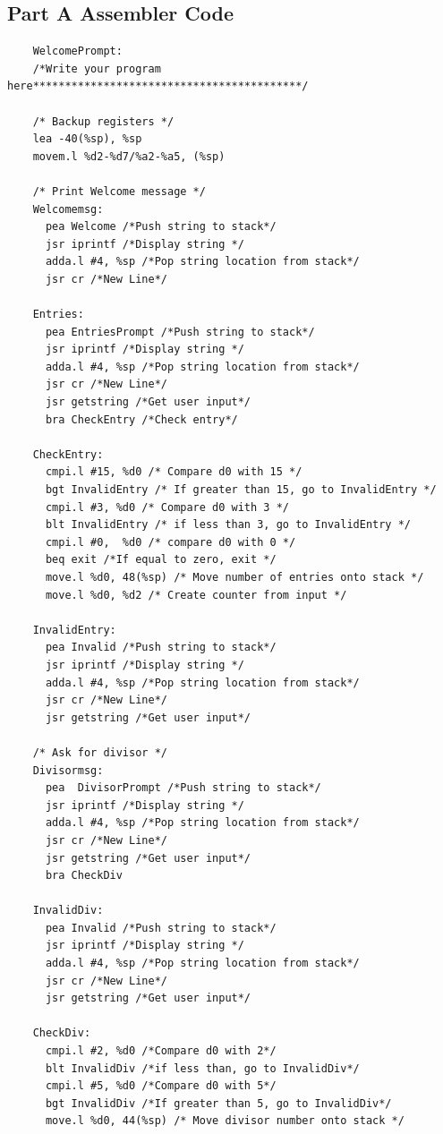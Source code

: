 \documentclass[10pt, letterpaper, titlepage]{article} %
\begin{document}
\newpage

\subsection{Part A Assembler Code}
\begin{lstlisting}
	WelcomePrompt:
	/*Write your program here******************************************/
	
	/* Backup registers */
	lea -40(%sp), %sp
	movem.l %d2-%d7/%a2-%a5, (%sp)
	
	/* Print Welcome message */
	Welcomemsg:
	  pea Welcome /*Push string to stack*/
	  jsr iprintf /*Display string */
	  adda.l #4, %sp /*Pop string location from stack*/
	  jsr cr /*New Line*/
	
	Entries:
	  pea EntriesPrompt /*Push string to stack*/
	  jsr iprintf /*Display string */
	  adda.l #4, %sp /*Pop string location from stack*/
	  jsr cr /*New Line*/
	  jsr getstring /*Get user input*/
	  bra CheckEntry /*Check entry*/
	
	CheckEntry:
	  cmpi.l #15, %d0 /* Compare d0 with 15 */
	  bgt InvalidEntry /* If greater than 15, go to InvalidEntry */
	  cmpi.l #3, %d0 /* Compare d0 with 3 */
	  blt InvalidEntry /* if less than 3, go to InvalidEntry */
	  cmpi.l #0,  %d0 /* compare d0 with 0 */
	  beq exit /*If equal to zero, exit */
	  move.l %d0, 48(%sp) /* Move number of entries onto stack */
	  move.l %d0, %d2 /* Create counter from input */
	
	InvalidEntry:
	  pea Invalid /*Push string to stack*/
	  jsr iprintf /*Display string */
	  adda.l #4, %sp /*Pop string location from stack*/
	  jsr cr /*New Line*/
	  jsr getstring /*Get user input*/
	
	/* Ask for divisor */
	Divisormsg:
	  pea  DivisorPrompt /*Push string to stack*/
	  jsr iprintf /*Display string */
	  adda.l #4, %sp /*Pop string location from stack*/
	  jsr cr /*New Line*/
	  jsr getstring /*Get user input*/
	  bra CheckDiv
	
	InvalidDiv:
	  pea Invalid /*Push string to stack*/
	  jsr iprintf /*Display string */
	  adda.l #4, %sp /*Pop string location from stack*/
	  jsr cr /*New Line*/
	  jsr getstring /*Get user input*/
	
	CheckDiv:
	  cmpi.l #2, %d0 /*Compare d0 with 2*/
	  blt InvalidDiv /*if less than, go to InvalidDiv*/
	  cmpi.l #5, %d0 /*Compare d0 with 5*/
	  bgt InvalidDiv /*If greater than 5, go to InvalidDiv*/
	  move.l %d0, 44(%sp) /* Move divisor number onto stack */
	

\end{lstlisting}
\end{document}
